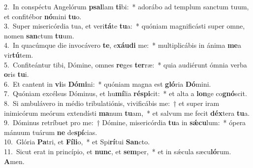 {2.~}In conspéctu Angelórum \textbf{psal}lam \textbf{ti}bi:~* adorábo ad templum sanctum tuum, et confitébor \textbf{nó}mini \textbf{tu}o.\\
{3.~}Super misericórdia tua, et veri\textbf{tá}te \textbf{tu}a:~* quóniam magnificásti super omne, nomen \textbf{san}ctum \textbf{tu}um.\\
{4.~}In quacúmque die invocávero \textbf{te}, e\textbf{xáu}\textbf{di} me:~* multiplicábis in ánima \textbf{me}a vir\textbf{tú}tem.\\
{5.~}Confiteántur tibi, Dómine, omnes \textbf{re}ges \textbf{ter}ræ:~* quia audiérunt ómnia verba \textbf{o}ris \textbf{tu}i.\\
{6.~}Et cantent in \textbf{vi}is \textbf{Dó}\textbf{mi}ni:~* quóniam magna est \textbf{gló}ria \textbf{Dó}mini.\\
{7.~}Quóniam excélsus Dóminus, et hu\textbf{mí}lia \textbf{ré}\textbf{spi}cit:~* et alta a \textbf{lon}ge co\textbf{gnó}scit.\\
{8.~}Si ambulávero in médio tribulatiónis, vivificábis me:~† et super iram inimicórum meórum extendísti \textbf{ma}num \textbf{tu}am,~* et salvum me fecit \textbf{déx}tera \textbf{tu}a.\\
{9.~}Dóminus retríbuet pro me:~† Dómine, misericórdia \textbf{tu}a in \textbf{sǽ}\textbf{cu}lum:~* ópera mánuum tuárum \textbf{ne} de\textbf{spí}cias.\\
{10.~}Glória \textbf{Pa}tri, et \textbf{Fí}\textbf{li}o,~* et Spi\textbf{rí}tui \textbf{San}cto.\\
{11.~}Sicut erat in princípio, et \textbf{nunc}, et \textbf{sem}per,~* et in sǽcula sæcu\textbf{ló}rum. \textbf{A}men.\\

